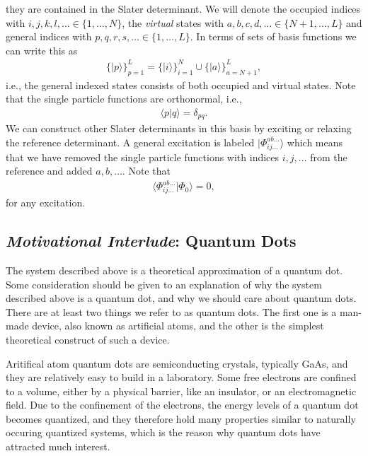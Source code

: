 \documentclass[
    a4paper, aps, twocolumn, floatfix, superscriptaddress,
    nofootinbib]{revtex4-1}
\newcommand{\1}{\mathds{1}}
\newcommand{\ket}[1]{\rvert #1\rangle}
\newcommand{\braket}[2]{\langle #1 \vert #2 \rangle}
\begin{document}
    they are contained in the Slater determinant.  We will denote the occupied
    indices with $i, j, k, l, \dots \in \{1, \dots, N\}$, the \emph{virtual}
    states with $a, b, c, d, \dots \in \{N + 1, \dots, L\}$ and general indices
    with $p, q, r, s, \dots \in \{1, \dots, L\}$. In terms of sets of basis
    functions we can write this as
    \begin{align}
        \{\ket{p}\}_{p = 1}^L
        = \{\ket{i}\}_{i = 1}^N
        \cup
        \{\ket{a}\}_{a = N + 1}^L,
    \end{align}
    i.e., the general indexed states consists of both occupied and virtual
    states. Note that the single particle functions are orthonormal, i.e.,
    \begin{align}
        \braket{p}{q} = \delta_{pq}.
    \end{align}
    We can construct other Slater determinants in this basis by exciting
    or relaxing the reference determinant. A general excitation is labeled
    $\ket{\Phi_{ij\dots}^{ab\dots}}$ which means that we have removed the single
    particle functions with indices $i, j, \dots$ from the reference and added
    $a, b, \dots$. Note that
    \begin{align}
        \braket{\Phi^{ab\dots}_{ij\dots}}{\Phi_0} = 0,
        \label{eq:excited_overlap}
    \end{align}
    for any excitation.

    \subsection{\emph{Motivational Interlude}: Quantum Dots}

        The system described above is a theoretical approximation of a
        quantum dot. Some consideration should be given to an explanation of 
        why the system described above is a quantum dot, and why we should
        care about quantum dots.
        There are at least two things we refer to as quantum dots. The
        first one is a man-made device, also known as artificial atoms,
        and the other is the simplest theoretical construct of such a device.

        Aritifical atom quantum dots are semiconducting crystals, typically GaAs,
        and they are
        relatively easy to build in a laboratory. Some free electrons are 
        confined to a volume, either by a physical barrier, like an insulator,
        or an electromagnetic field\cite{reimann2002electronic}. Due to the
        confinement of the electrons, the energy levels of a quantum dot becomes
        quantized, and they therefore hold many properties similar to naturally
        occuring quantized systems, which is the reason why quantum dots have
        attracted much interest.  
\end{document}
